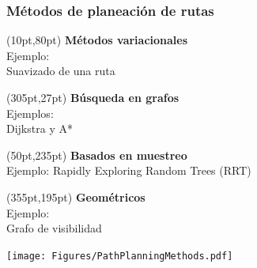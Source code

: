 \documentclass[10pt,spanish,aspectratio=1610]{beamer}
\begin{document}
\begin{frame}\frametitle{Métodos de planeación de rutas}
  \begin{textblock*}{0.4\textwidth}(10pt,80pt)
    \textbf{ Métodos variacionales }\\Ejemplo:\\ Suavizado de una ruta
  \end{textblock*}
  \begin{textblock*}{0.35\textwidth}(305pt,27pt)
    \textbf{Búsqueda en grafos }\\Ejemplos: \\Dijkstra y A*
  \end{textblock*}
  \begin{textblock*}{0.3\textwidth}(50pt,235pt)
    \textbf{Basados en muestreo }\\Ejemplo: Rapidly Exploring Random Trees (RRT)
  \end{textblock*}
  \begin{textblock*}{0.25\textwidth}(355pt,195pt)
    \textbf{Geométricos }\\Ejemplo: \\ Grafo de visibilidad
  \end{textblock*}
  \centering
  \texttt{[image: Figures/PathPlanningMethods.pdf]}
\end{frame}
\end{document}
